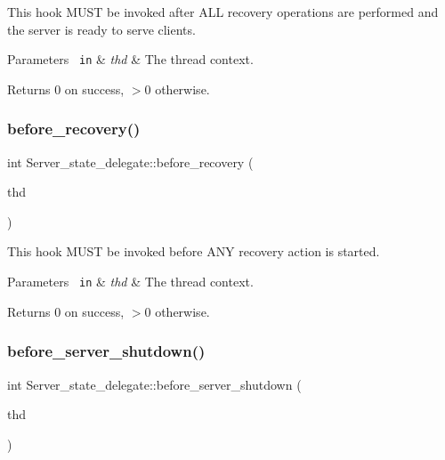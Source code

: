 This hook M\+U\+ST be invoked after A\+LL recovery operations are performed and the server is ready to serve clients.


\begin{DoxyParams}[1]{Parameters}
\mbox{\texttt{ in}}  & {\em thd} & The thread context. \\
\hline
\end{DoxyParams}
\begin{DoxyReturn}{Returns}
0 on success, $>$0 otherwise. 
\end{DoxyReturn}
\mbox{\label{classServer__state__delegate_a9a19117db22f1ac1371cfe804ab1d49a}} 
\subsubsection{\texorpdfstring{before\+\_\+recovery()}{before\_recovery()}}
{\footnotesize\ttfamily int Server\+\_\+state\+\_\+delegate\+::before\+\_\+recovery (\begin{DoxyParamCaption}\item[{T\+HD $\ast$}]{thd }\end{DoxyParamCaption})}

This hook M\+U\+ST be invoked before A\+NY recovery action is started.


\begin{DoxyParams}[1]{Parameters}
\mbox{\texttt{ in}}  & {\em thd} & The thread context. \\
\hline
\end{DoxyParams}
\begin{DoxyReturn}{Returns}
0 on success, $>$0 otherwise. 
\end{DoxyReturn}
\mbox{\label{classServer__state__delegate_a37e23e031cc508febdd6e6a74198e95a}} 
\subsubsection{\texorpdfstring{before\+\_\+server\+\_\+shutdown()}{before\_server\_shutdown()}}
{\footnotesize\ttfamily int Server\+\_\+state\+\_\+delegate\+::before\+\_\+server\+\_\+shutdown (\begin{DoxyParamCaption}\item[{T\+HD $\ast$}]{thd }\end{DoxyParamCaption})}

